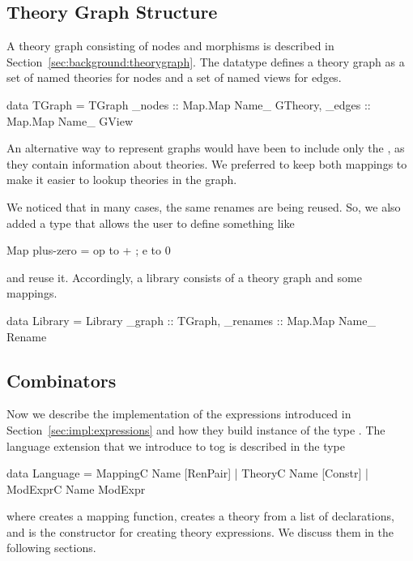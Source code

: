 \subsection{Theory Graph Structure}
\label{subsec:graph}
A theory graph consisting of nodes and morphisms is described in Section~\ref{sec:background:theorygraph}. The datatype  defines a theory graph as a set of named theories for nodes and a set of named views for edges. 
\begin{hscode}
data TGraph = TGraph { 
  _nodes :: Map.Map Name_ GTheory,
  _edges :: Map.Map Name_ GView } 
\end{hscode}
An alternative way to represent graphs would have been to include only the , as they contain information about theories. We preferred to keep both mappings to make it easier to lookup theories in the graph. 

We noticed that in many cases, the same renames are being reused. So, we also added a  type that allows the user to define something like 
\begin{hscode}
Map plus-zero = {op to + ; e to 0}
\end{hscode}
\noindent and reuse it. Accordingly, a library consists of a theory graph and some mappings. 
\begin{hscode}
data Library = Library {
  _graph   :: TGraph,
  _renames :: Map.Map Name_ Rename }
\end{hscode}

\subsection{Combinators}
\label{subsec:combinatorsImpl}
Now we describe the implementation of the expressions introduced in Section~\ref{sec:impl:expressions} and how they build instance of the type .  
The language extension that we introduce to tog is described in the type  
\begin{togcode}
data Language = 
    MappingC Name [RenPair]
  | TheoryC Name [Constr]
  | ModExprC Name ModExpr
\end{togcode}
\noindent where  creates a mapping function,  creates a theory from a list of declarations, and  is the constructor for creating theory expressions. We discuss them in the following sections. 


